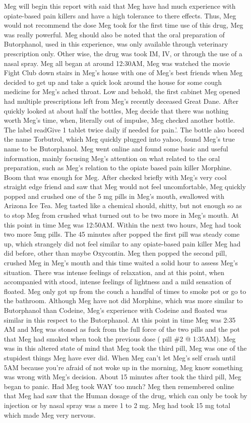 \documentclass[12pt]{book}
\begin{document}
Meg will begin this report with said that Meg have had much experience with opiate-based pain killers and have a high tolerance to there effects. Thus, Meg would not recommend the dose Meg took for the first time use of this drug, Meg was really powerful. Meg should also be noted that the oral preparation of Butorphanol, used in this experience, was only available through veterinary prescription only. Other wise, the drug was took IM, IV, or through the use of a nasal spray. Meg all began at around 12:30AM, Meg was watched the movie Fight Club down stairs in Meg's house with one of Meg's best friends when Meg decided to get up and take a quick look around the house for some cough medicine for Meg's ached throat. Low and behold, the first cabinet Meg opened had multiple prescriptions left from Meg's recently deceased Great Dane. After quickly looked at about half the bottles, Meg decide that there was nothing worth Meg's time, when, literally out of impulse, Meg checked another bottle. The label readGive 1 tablet twice daily if needed for pain.'. The bottle also bored the name Torbutrol, which Meg quickly plugged into yahoo, found Meg's true name to be Butorphanol. Meg went online and found some basic and useful information, mainly focusing Meg's attention on what related to the oral preparation, such as Meg's relation to the opiate based pain killer Morphine. Boom that was enough for Meg. After checked briefly with Meg's very cool straight edge friend and saw that Meg would not feel uncomfortable, Meg quickly popped and crushed one of the 5 mg pills in Meg's mouth, swallowed with Arizona Ice Tea. Meg tasted like a chemical should, shitty, but not enough so as to stop Meg from crushed what turned out to be two more in Meg's mouth. At this point in time Meg was 12:50AM. Within the next two hours, Meg had took two more 5mg pills. The 45 minutes after popped the first pill was steady come up, which strangely did not feel similar to any opiate-based pain killer Meg had did before, other than maybe Oxycontin. Meg then popped the second pill, crushed Meg in Meg's mouth and this time waited a solid hour to assess Meg's situation. There was intense feelings of relaxation, and at this point, when accompanied with stood, intense feelings of lightness and a mild sensation of floated. Meg only got up from the couch a handful of times to smoke pot or go to the bathroom. Although Meg have not did Morphine, which was more similar to Butorphanol than Codeine, Meg's experience with Codeine and floated was similar in this respect to the Butorphanol. At this point in time Meg was 2:35 AM and Meg was stoned as fuck from the full force of the two pills and the pot that Meg had smoked when took the previous dose ( pill \#2 @ 1:35AM). Meg was in this altered state of mind that Meg took the third pill, Meg was one of the stupidest things Meg have ever did. When Meg can't let Meg's self crash until 5AM because you're afraid of not woke up in the morning, Meg know something was wrong with Meg's decision. About 15 minutes after took the third pill, Meg began to panic. Had Meg took WAY too much? Meg then remembered online that Meg had saw that the Human dosage of the drug, which can only be took by injection or by nasal spray was a mere 1 to 2 mg. Meg had took 15 mg total which made Meg very nervous. 
\end{document}
